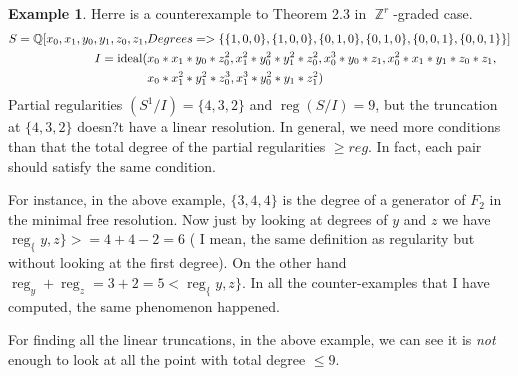 \documentclass[11pt]{amsart}
\DeclareMathOperator{\reg}{reg}
\DeclareMathOperator{\Z}{\mathbb{Z}}
\theoremstyle{definition}
\newtheorem{example}[thm]{Example}
\begin{document}
\begin{example}
 Herre is a counterexample to Theorem 2.3 in $\Z^r$-graded case. 
\begin{align*}
S =  \mathbb Q[x_0,x_1,y_0,y_1,z_0,z_1 ,&Degrees=>\{\{1,0,0\},\{1,0,0\},\{0,1,0\},\{0,1,0\},\{0,0,1\},\{0,0,1\}\}]\\
 I = {\rm ideal}(&x_0*x_1*y_0*z_0^2, x_1^2*y_0^2*y_1^2*z_0^2, x_0^3*y_0*z_1, x_0^2*x_1*y_1*z_0*z_1,\\
 &x_0*x_1^2*y_1^2*z_0^3, x_1^3*y_0^2*y_1*z_1^2)
\end{align*}
Partial regularities $(S^1/I)= \{4,3,2\}$ and  $\reg(S/I)=9$, but the truncation at $\{4,3,2\}$ doesn?t have a linear resolution. In general, we need more conditions than that the total degree of the partial regularities $\geq reg$.   In fact, each pair should satisfy the same condition.
 
 For instance, in the above example, $\{3,4,4\}$ is the degree of a generator of $F_2$ in the minimal free resolution. Now just by looking at degrees of $y$ and $z$ we have  $\reg_\{y, z\}>= 4+4-2=6$ ( I mean, the same definition
 as regularity but without looking at the first degree).  On the other hand 
 $\reg_y+\reg_z= 3+2=5 < \reg_\{y, z\}.$   In all the counter-examples that I have computed, the same phenomenon happened.

 For finding all the linear truncations, in the above example, we can see it is \emph{not} enough to look at all the point with total degree $\leq 9$.
\end{example}
\end{document}
